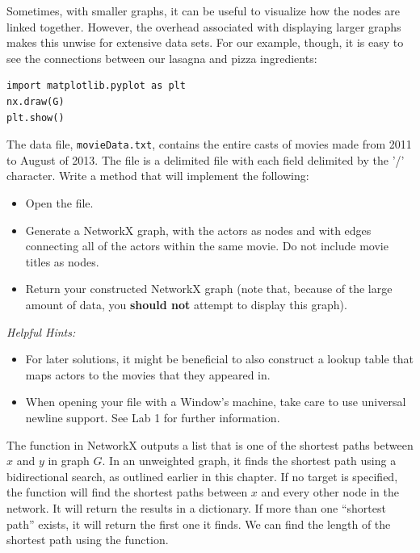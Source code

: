 Sometimes, with smaller graphs, it can be useful to visualize how the nodes are linked together. However, the overhead associated with displaying larger graphs makes this unwise for extensive data sets. For our example, though, it is easy to see the connections between our lasagna and pizza ingredients:

\begin{lstlisting}
import matplotlib.pyplot as plt
nx.draw(G)
plt.show()
\end{lstlisting}


\begin{problem}
The data file, \texttt{movieData.txt}, contains the entire casts of movies made from 2011 to August of 2013. The file is a delimited file with each field delimited by the '/' character. Write a method that will implement the following:
\begin{itemize}
\item Open the file.
\item Generate a NetworkX graph, with the actors as nodes and with edges connecting all of the actors within the same movie. Do not include movie titles as nodes.
\item Return your constructed NetworkX graph (note that, because of the large amount of data, you \textbf{should not} attempt to display this graph).
\end{itemize}
\emph{Helpful Hints:}
\begin{itemize}
\item For later solutions, it might be beneficial to also construct a lookup table that maps actors to the movies that they appeared in.
\item When opening your file with a Window's machine, take care to use universal newline support. See Lab 1 for further information.
\end{itemize}
\end{problem}

The  function in NetworkX outputs a list that is one of the shortest paths between $x$ and $y$ in graph $G$.  In an unweighted graph, it finds the shortest path using a bidirectional search, as outlined earlier in this chapter. If no target is specified, the function will find the shortest paths between $x$ and every other node in the network.  It will return the results in a dictionary.  If more than one ``shortest path'' exists, it will return the first one it finds.  We can find the length of the shortest path using the  function.

